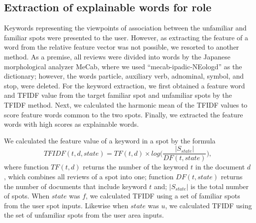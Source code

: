 \documentclass[journal]{IAENGtran}
\begin{document}
\subsection{Extraction of explainable words for role}
\label{subsec:Extraction of explainable words for role}
Keywords representing the viewpoints of association between the unfamiliar and familiar spots were presented to the user.
However, as extracting the feature of a word from the relative feature vector was not possible, we resorted to another method.
As a premise, all reviews were divided into words by the Japanese morphological analyzer MeCab, where we used ``mecab-ipadic-NEologd'' as the dictionary; however, the words particle, auxiliary verb, adnominal, symbol, and stop, were deleted.
For the keyword extraction, we first obtained a feature word and TFIDF value from the target familiar spot and unfamiliar spots by the TFIDF method.
Next, we calculated the harmonic mean of the TFIDF values to score feature words common to the two spots.
Finally, we extracted the feature words with high scores as explainable words.

We calculated the feature value of a keyword in a spot by the formula
\begin{equation}
  TFIDF(t,d,state) = TF(t,d) \times log\Biggr(\frac{|S_{state}|}{DF(t,state)}\Biggr),
  \label{math:TFIDF}
\end{equation}
where function $TF(t,d)$ returns the number of the keyword $t$ in the document $d$, which combines all reviews of a spot into one; function $DF(t,state)$ returns the number of documents that include keyword $t$ and; $|S_{state}|$ is the total number of spots.
When $state$ was $f$, we calculated TFIDF using a set of familiar spots from the user spot inputs.
Likewise when $state$ was $u$, we calculated TFIDF using the set of unfamiliar spots from the user area inputs.
\end{document}
